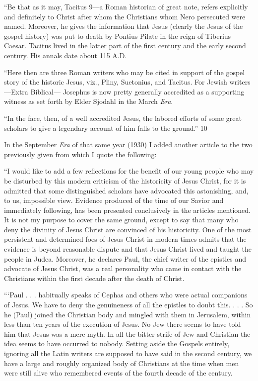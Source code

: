 ``Be that as it may, Tacitus 9—a Roman historian of great note, refers explicitly and
definitely to Christ after whom the Christians whom Nero persecuted were named. Moreover,
he gives the information that Jesus (clearly the Jesus of the gospel history) was put to death
by Pontius Pilate in the reign of Tiberius Caesar. Tacitus lived in the latter part of the first
century and the early second century. His annals date about 115 A.D.

``Here then are three Roman writers who may be cited in support of the gospel story of the
historic Jesus, viz., Pliny, Suetonius, and Tacitus. For Jewish writers—Extra Biblical—
Josephus is now pretty generally accredited as a supporting witness as set forth by Elder
Sjodahl in the March \textit{Era}.

``In the face, then, of a well accredited Jesus, the labored efforts of some great scholars to
give a legendary account of him falls to the ground.'' 10

In the September \textit{Era} of that same year (1930) I added another article to the two previously
given from which I quote the following:

``I would like to add a few reflections for the benefit of our young people who may be
disturbed by this modern criticism of the historicity of Jesus Christ, for it is admitted that
some distinguished scholars have advocated this astonishing, and, to us, impossible view.
Evidence produced of the time of our Savior and immediately following, has been presented
conclusively in the articles mentioned. It is not my purpose to cover the same ground, except
to say that many who deny the divinity of Jesus Christ are convinced of his historicity. One
of the most persistent and determined foes of Jesus Christ in modern times admits that the
evidence is beyond reasonable dispute and that Jesus Christ lived and taught the people in
Judea. Moreover, he declares Paul, the chief writer of the epistles and advocate of Jesus
Christ, was a real personality who came in contact with the Christians within the first decade
after the death of Christ.

```Paul . . . habitually speaks of Cephas and others who were actual companions of Jesus. We
have to deny the genuineness of all the epistles to doubt this. . . . So he (Paul) joined the
Christian body and mingled with them in Jerusalem, within less than ten years of the
execution of Jesus. No Jew there seems to have told him that Jesus was a mere myth. In all
the bitter strife of Jew and Christian the idea seems to have occurred to nobody. Setting aside
the Gospels entirely, ignoring all the Latin writers are supposed to have said in the second
century, we have a large and roughly organized body of Christians at the time when men
were still alive who remembered events of the fourth decade of the century.


